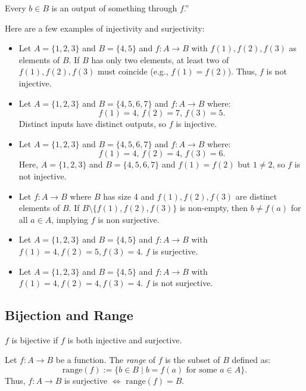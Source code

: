 \documentclass[11pt]{article}
\begin{document}
\begin{fact}
    Every $b \in B$ is an output of something through $f$.''

\end{fact}

\begin{example}
    Here are a few examples of injectivity and surjectivity:
    \begin{itemize}

        \item Let $A = \{1, 2, 3\}$ and $B = \{4, 5\}$ and $f: A \to B$ with $f(1), f(2),
                  f(3)$ as elements of $B$. If $B$ has only two elements, at least two of $f(1),
                  f(2), f(3)$ must coincide (e.g., $f(1) = f(2)$). Thus, $f$ is not injective.
        \item Let $A = \{1, 2, 3\}$ and $B = \{4, 5, 6, 7\}$ and $f : A \to B$ where:
              \[
                  f(1) = 4, \, f(2) = 7, \, f(3) = 5.
              \]
              Distinct inputs have distinct outputs, so $f$ is injective.
        \item Let $A = \{1, 2, 3\}$ and $B = \{4, 5, 6, 7\}$ and $f : A \to B$ where:
              \[
                  f(1) = 4, \, f(2) = 4, \, f(3) = 6.
              \]
              Here, $A = \{1, 2, 3\}$ and $B = \{4, 5, 6, 7\}$ and $f(1) = f(2)$ but $1 \neq
                  2$, so $f$ is not injective.
        \item Let $f : A \to B$ where $B$ has size 4 and $f(1), f(2), f(3)$ are distinct
              elements of $B$. If $B \setminus \{f(1), f(2), f(3)\}$ is non-empty, then $b
                  \neq f(a)$ for all \(a \in A\), implying \(f\) is non surjective.
        \item Let $A = \{1, 2, 3\}$ and $B = \{4, 5\}$ and $f: A \to B$ with $f(1) = 4, f(2)
                  = 5, f(3) = 4$. $f$ is surjective.
        \item Let $A = \{1, 2, 3\}$ and $B = \{4, 5\}$ and $f: A \to B$ with $f(1) = 4, f(2)
                  = 4, f(3) = 4$. $f$ is not surjective.
    \end{itemize}
\end{example}

\subsection{Bijection and Range}
\begin{definition} [Bijectivity]

    $f$ is bijective if $f$ is both injective and surjective.
\end{definition}
\begin{definition}

    Let $f : A \to B$ be a function. The \textit{range} of $f$ is the subset of $B$
    defined as:
    \[
        \text{range}(f) := \{ b \in B \mid b = f(a) \text{ for some } a \in A \}.
    \]
    Thus, $f : A \to B$ is surjective \(\Longleftrightarrow\) $\text{range}(f) =
        B$.
\end{definition}
\end{document}
